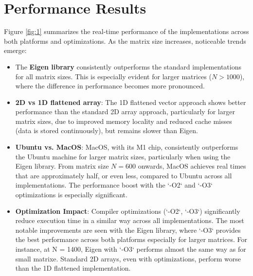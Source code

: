 \documentclass{article}
\begin{document}
\vspace{-0.7cm}  %


\section{Performance Results}

Figure \ref{fig:1} summarizes the real-time performance of the implementations across both platforms and optimizations. As the matrix size increases, noticeable trends emerge:

\begin{itemize}
    \item The \textbf{Eigen library} consistently outperforms the standard implementations for all matrix sizes. This is especially evident for larger matrices (\(N > 1000\)), where the difference in performance becomes more pronounced.
    \item  \textbf{2D vs 1D flattened array}: The 1D flattened vector approach shows better performance than the standard 2D array approach, particularly for larger matrix sizes, due to improved memory locality and reduced cache misses (data is stored continuously), but remains slower than Eigen.
    \item \textbf{Ubuntu vs. MacOS}: MacOS, with its M1 chip, consistently outperforms the Ubuntu machine for larger matrix sizes, particularly when using the Eigen library. From matrix size \(N = 600\) onwards, MacOS achieves real times that are approximately half, or even less, compared to Ubuntu across all implementations. The performance boost with the `-O2` and `-O3` optimizations is especially significant.
    \item \textbf{Optimization Impact}: Compiler optimizations (`-O2`, `-O3`) significantly reduce execution time in a similar way across all implementations. The most notable improvements are seen with the Eigen library, where `-O3` provides the best performance across both platforms especially for larger matrices. For instance, at N = 1400, Eigen with `-O3` performs almost the same way as for small matrixe. Standard 2D arrays, even with optimizations, perform worse than the 1D flattened implementation.
\end{itemize}
\end{document}
